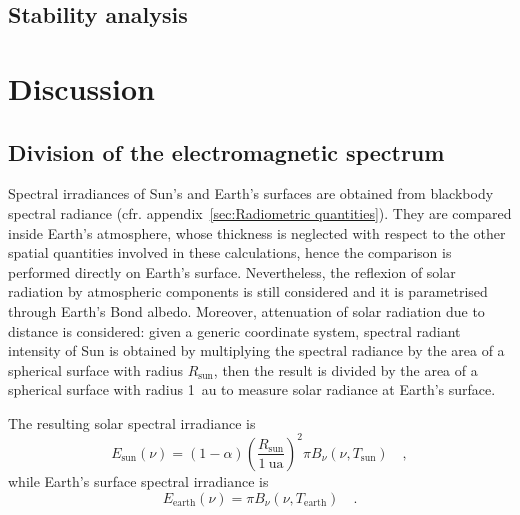 \documentclass[a4paper,10pt,twocolumn,\classoptions]{article}
\begin{document}
\subsection{Stability analysis}



\section{Discussion}



\subsection{Division of the electromagnetic spectrum}
\label{sec:Division of the electromagnetic spectrum}
Spectral irradiances of Sun's and Earth's surfaces are obtained from blackbody spectral radiance (cfr. appendix~\ref{sec:Radiometric quantities}). They are compared inside Earth's atmosphere, whose thickness is neglected with respect to the other spatial quantities involved in these calculations, hence the comparison is performed directly on Earth's surface. Nevertheless, the reflexion of solar radiation by atmospheric components is still considered and it is parametrised through Earth's Bond albedo. Moreover, attenuation of solar radiation due to distance is considered: given a generic coordinate system, spectral radiant intensity of Sun is obtained by multiplying the spectral radiance by the area of a spherical surface with radius $R_\text{sun}$, then the result is divided by the area of a spherical surface with radius \qty{1}{\astronomicalunit} to measure solar radiance at Earth's surface.

The resulting solar spectral irradiance is
\begin{equation}
  \label{eq:spectral_irradiance_sun}
  E_\text{sun}(\nu) = (1 - \alpha) \left( \frac{R_\text{sun}}{\qty{1}{\astronomicalunit}} \right)^2 \pi B_\nu(\nu, T_\text{sun})
  \quad ,
\end{equation}
while Earth's surface spectral irradiance is
\begin{equation}
  \label{eq:spectral_irradiance_earth}
  E_\text{earth}(\nu) = \pi B_\nu(\nu, T_\text{earth})
  \quad .
\end{equation}
\end{document}
